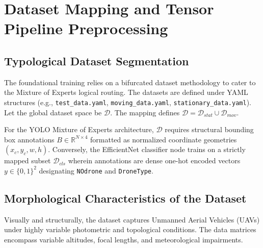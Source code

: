 \documentclass[11pt, letterpaper, oneside, openany]{book}
\begin{document}
\chapter{Dataset Mapping and Tensor Pipeline Preprocessing}

\section{Typological Dataset Segmentation}
The foundational training relies on a bifurcated dataset methodology to cater to the Mixture of Experts logical routing. The datasets are defined under YAML structures (e.g., \texttt{test\_data.yaml}, \texttt{moving\_data.yaml}, \texttt{stationary\_data.yaml}). Let the global dataset space be $\mathcal{D}$. The mapping defines $\mathcal{D} = \mathcal{D}_{stat} \cup \mathcal{D}_{mov}$.

For the YOLO Mixture of Experts architecture, $\mathcal{D}$ requires structural bounding box annotations $B \in \mathbb{R}^{N \times 4}$ formatted as normalized coordinate geometries $(x_c, y_c, w, h)$. Conversely, the EfficientNet classifier node trains on a strictly mapped subset $\mathcal{D}_{cls}$ wherein annotations are dense one-hot encoded vectors $y \in \{0, 1\}^2$ designating \texttt{NOdrone} and \texttt{DroneType}. 

\section{Morphological Characteristics of the Dataset}
Visually and structurally, the dataset captures Unmanned Aerial Vehicles (UAVs) under highly variable photometric and topological conditions. The data matrices encompass variable altitudes, focal lengths, and meteorological impairments. 
\end{document}
